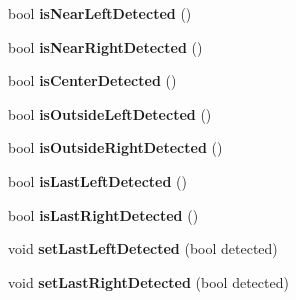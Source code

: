 \begin{DoxyCompactItemize}
\item 
\hypertarget{class_noeud_robot_a80b2c83b5bcca76ab8c5d50967dd9637}{bool {\bfseries is\-Near\-Left\-Detected} ()}\label{class_noeud_robot_a80b2c83b5bcca76ab8c5d50967dd9637}

\item 
\hypertarget{class_noeud_robot_a8d18374cb7ccc6abf7d81e84b5e2895a}{bool {\bfseries is\-Near\-Right\-Detected} ()}\label{class_noeud_robot_a8d18374cb7ccc6abf7d81e84b5e2895a}

\item 
\hypertarget{class_noeud_robot_a009107b9beb4b85c4e45093662259997}{bool {\bfseries is\-Center\-Detected} ()}\label{class_noeud_robot_a009107b9beb4b85c4e45093662259997}

\item 
\hypertarget{class_noeud_robot_a0b353d1b8a72a8bc0c74af495856175c}{bool {\bfseries is\-Outside\-Left\-Detected} ()}\label{class_noeud_robot_a0b353d1b8a72a8bc0c74af495856175c}

\item 
\hypertarget{class_noeud_robot_ada097c4f0d1cff06c4205e057a4ff7b3}{bool {\bfseries is\-Outside\-Right\-Detected} ()}\label{class_noeud_robot_ada097c4f0d1cff06c4205e057a4ff7b3}

\item 
\hypertarget{class_noeud_robot_af19faf1dcf809f0fb5419089f6d5c4c1}{bool {\bfseries is\-Last\-Left\-Detected} ()}\label{class_noeud_robot_af19faf1dcf809f0fb5419089f6d5c4c1}

\item 
\hypertarget{class_noeud_robot_a11213fc3369ed504b62234882935716d}{bool {\bfseries is\-Last\-Right\-Detected} ()}\label{class_noeud_robot_a11213fc3369ed504b62234882935716d}

\item 
\hypertarget{class_noeud_robot_ab8c2a79fe2277ded055e3303ed1493f2}{void {\bfseries set\-Last\-Left\-Detected} (bool detected)}\label{class_noeud_robot_ab8c2a79fe2277ded055e3303ed1493f2}

\item 
\hypertarget{class_noeud_robot_a47e2bec0b719767da186577d4e8cbb4b}{void {\bfseries set\-Last\-Right\-Detected} (bool detected)}\label{class_noeud_robot_a47e2bec0b719767da186577d4e8cbb4b}


\end{DoxyCompactItemize}
